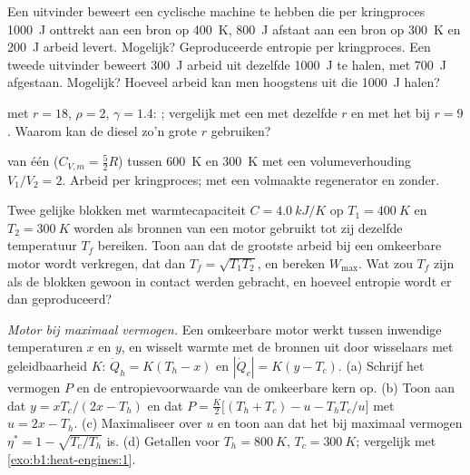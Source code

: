 \begin{exercise}[$\star\star$]\label{exo:b1:heat-engines:6}
Een uitvinder beweert een cyclische machine te hebben die per kringproces \qty{1000}{J}
onttrekt aan een bron op \qty{400}{K}, \qty{800}{J} afstaat aan een bron op
\qty{300}{K} en \qty{200}{J} arbeid levert. Mogelijk? Geproduceerde entropie
per kringproces. Een tweede uitvinder beweert \qty{300}{J} arbeid uit dezelfde
\qty{1000}{J} te halen, met \qty{700}{J} afgestaan. Mogelijk? Hoeveel arbeid kan men
hoogstens uit die \qty{1000}{J} halen?
\end{exercise}

\begin{exercise}[$\star\star$]\label{exo:b1:heat-engines:7}
 met $r = 18$, $\rho = 2$, $\gamma = 1.4$: ;
vergelijk met een  met dezelfde $r$ en met het  bij
$r = 9$. Waarom kan de diesel zo'n grote $r$ gebruiken?
\end{exercise}

\begin{exercise}[$\star\star$]\label{exo:b1:heat-engines:8}
 van één   ($C_{V,m} = \tfrac52R$) tussen
\qty{600}{K} en \qty{300}{K} met een volumeverhouding $V_1/V_2 = 2$. Arbeid per
kringproces;  met een volmaakte regenerator en zonder.
\end{exercise}

\begin{exercise}[$\star\star$]\label{exo:b1:heat-engines:9}
Twee gelijke blokken met warmtecapaciteit $C = \qty{4.0}{kJ/K}$ op $T_1 =
\qty{400}{K}$ en $T_2 = \qty{300}{K}$ worden als bronnen van een motor gebruikt
tot zij dezelfde temperatuur $T_f$ bereiken. Toon aan dat de grootste arbeid
bij een omkeerbare motor wordt verkregen, dat dan $T_f = \sqrt{T_1T_2}$, en
bereken $W_{\max}$. Wat zou $T_f$ zijn als de blokken gewoon in contact werden
gebracht, en hoeveel entropie wordt er dan geproduceerd?
\end{exercise}

\begin{exercise}[$\star\star\star$]\label{exo:b1:heat-engines:10}
\emph{Motor bij maximaal vermogen.} Een omkeerbare motor werkt tussen
inwendige temperaturen $x$ en $y$, en wisselt warmte met de bronnen uit
door wisselaars met geleidbaarheid $K$: $\dot Q_h = K(T_h - x)$ en
$|\dot Q_c| = K(y - T_c)$. (a) Schrijf het vermogen $P$ en de entropievoorwaarde
van de omkeerbare kern op. (b) Toon aan dat $y = xT_c/(2x - T_h)$ en
dat $P = \frac{K}{2}\bigl[(T_h + T_c) - u - T_hT_c/u\bigr]$ met $u = 2x - T_h$.
(c) Maximaliseer over $u$ en toon aan dat het  bij maximaal vermogen
$\eta^\ast = 1 - \sqrt{T_c/T_h}$ is. (d) Getallen voor $T_h = \qty{800}{K}$,
$T_c = \qty{300}{K}$; vergelijk met \cref{exo:b1:heat-engines:1}.
\end{exercise}

